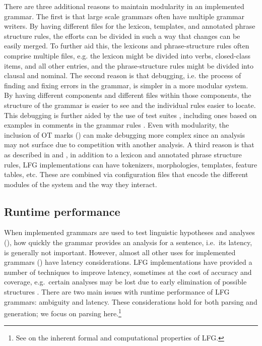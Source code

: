 \documentclass[output=paper,hidelinks]{langscibook}
\begin{document}
       There are three additional reasons to maintain modularity in an implemented grammar. The first is that large scale grammars often have multiple grammar writers. By having different files for the lexicon, templates, and annotated phrase structure rules, the efforts can be divided in such a way that changes can be easily merged. To further aid this, the lexicons and phrase-structure rules often comprise multiple files, e.g. the lexicon might be divided into verbs, closed-class items, and all other entries, and the phrase-structure rules might be divided into clausal and nominal. The second reason is that debugging, i.e. the process of finding and fixing errors in the grammar, is simpler in a more modular system. By having different components and different files within those components, the structure of the grammar is easier to see and the individual rules easier to locate. This debugging is further aided by the use of test suites \citep{chatzetal07,depaivaking08}, including ones based on examples in comments in the grammar rules \citep{dipper03}. Even with modularity, the inclusion of OT marks () can make debugging more complex since an analysis may not surface due to competition with another analysis. A third reason is that as described in  and , in addition to a lexicon and annotated phrase structure rules,   LFG implementations can have tokenizers, morphologies, templates, feature tables, etc. These are combined via configuration files that encode the different modules of the system and the way they interact.

%

\subsection{Runtime performance}
\label{sec:runtime_performance}

When implemented grammars are used to test linguistic hypotheses and analyses (), how quickly the grammar provides an analysis for a sentence, i.e.\ its latency, is generally not important. However, almost all other uses for implemented grammars () have latency considerations. LFG implementations have provided a number of techniques to improve latency, sometimes at the cost of accuracy and coverage, e.g.\ certain analyses may be lost due to early elimination of possible structures \citep{kaplanetal04}.  There are two main issues with runtime performance of LFG grammars: ambiguity and latency. These considerations hold for both parsing and generation; we focus on parsing here.\footnote{See  on the inherent formal and computational properties of LFG.}
\end{document}
